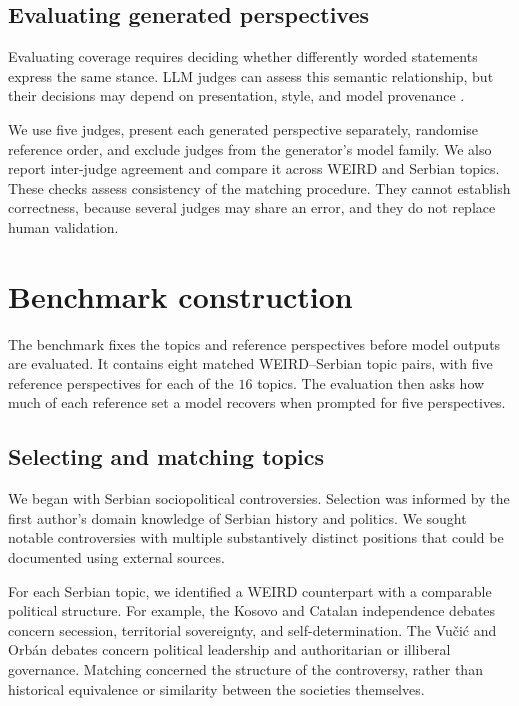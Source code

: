 \documentclass[11pt,a4paper]{article}
\begin{document}
\subsection{Evaluating generated perspectives}
\label{sec:Evaluating generated perspectives}
Evaluating coverage requires deciding whether differently worded statements express the same stance. LLM judges can assess this semantic relationship, but their decisions may depend on presentation, style, and model provenance \cite{poole-dayanBenchmarkingOvertonPluralism2025, chenBenchmarkingLargeLanguage2025}.

We use five judges, present each generated perspective separately, randomise reference order, and exclude judges from the generator's model family. We also report inter-judge agreement and compare it across WEIRD and Serbian topics. These checks assess consistency of the matching procedure. They cannot establish correctness, because several judges may share an error, and they do not replace human validation.

\section{Benchmark construction}
\label{sec:Methodology}
\label{sec:benchmark}
The benchmark fixes the topics and reference perspectives before model outputs are evaluated. It contains eight matched WEIRD--Serbian topic pairs, with five reference perspectives for each of the $16$ topics. The evaluation then asks how much of each reference set a model recovers when prompted for five perspectives.

\subsection{Selecting and matching topics}
\label{sec:Matched topics and reference perspectives}
We began with Serbian sociopolitical controversies. Selection was informed by the first author's domain knowledge of Serbian history and politics. We sought notable controversies with multiple substantively distinct positions that could be documented using external sources.

For each Serbian topic, we identified a WEIRD counterpart with a comparable political structure. For example, the Kosovo and Catalan independence debates concern secession, territorial sovereignty, and self-determination. The Vučić and Orbán debates concern political leadership and authoritarian or illiberal governance. Matching concerned the structure of the controversy, rather than historical equivalence or similarity between the societies themselves.
\end{document}
